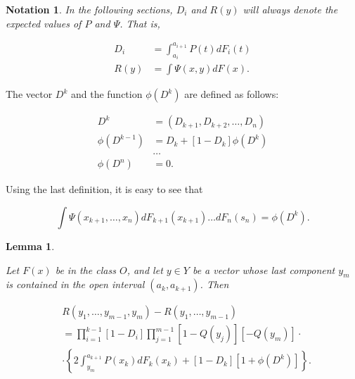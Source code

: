 \documentclass{article}
\newtheorem{lemma}{Lemma}
\newtheorem{notation}{Notation}
\begin{document}
\begin{notation}

In the following sections, $D_i$ and $R(y)$ will always denote the expected
values of $P$ and $\Psi$. That is,

\[
\begin{aligned}
D_i &= \int_{a_i}^{a_{i+1}} P(t) dF_i(t) \\
R(y) &= \int \Psi(x,y) dF(x).
\end{aligned}
\]

\end{notation}

The vector $D^k$ and the function $\phi(D^k)$ are defined as follows:

\[
\begin{aligned}
D^k &= (D_{k+1}, D_{k+2}, \dots, D_n) \\
\phi(D^{k-1}) &= D_k + [1 - D_k] \phi(D^k) \\
& \dots \\
\phi(D^{n}) &= 0.
\end{aligned}
\]

Using the last definition, it is easy to see that

\[
\int \Psi(x_{k+1}, \dots, x_n) dF_{k+1}(x_{k+1}) \dots dF_n(s_n)
= \phi(D^k).
\]

\begin{lemma} \label{lemma:marginal-r-formula}

Let $F(x)$ be in the class $O$, and let $y \in Y$ be a vector whose last
component $y_m$ is contained in the open interval $(a_k, a_{k+1})$. Then

\[
\begin{aligned}
& R(y_1, \dots, y_{m-1}, y_m) - R(y_1, \dots, y_{m-1}) \\
&= \prod_{i=1}^{k-1} [1 - D_i] \prod_{j=1}^{m-1} [1 - Q(y_j)][-Q(y_m)] \cdot \\
&\cdot \left \{
  2 \int_{y_m}^{a_{k+1}} P(x_k) dF_k(x_k) + [1 - D_k][1 + \phi(D^k)]
\right \}.
\end{aligned}
\]

\end{lemma}
\end{document}
